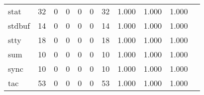 \begin{longtable}{lp{1.20cm}p{1.20cm}p{1.20cm}p{1.20cm}p{1.20cm}p{1.20cm}p{1.20cm}p{1.20cm}p{1.20cm}p{1.20cm}}
stat      &                                    32 &                                                  0 &                                                  0 &                                                  0 &                                                  0 &                                                 32 &                                         1.000 &                                              1.000 &                                              1.000 \\
stdbuf    &                                    14 &                                                  0 &                                                  0 &                                                  0 &                                                  0 &                                                 14 &                                         1.000 &                                              1.000 &                                              1.000 \\
stty      &                                    18 &                                                  0 &                                                  0 &                                                  0 &                                                  0 &                                                 18 &                                         1.000 &                                              1.000 &                                              1.000 \\
sum       &                                    10 &                                                  0 &                                                  0 &                                                  0 &                                                  0 &                                                 10 &                                         1.000 &                                              1.000 &                                              1.000 \\
sync      &                                    10 &                                                  0 &                                                  0 &                                                  0 &                                                  0 &                                                 10 &                                         1.000 &                                              1.000 &                                              1.000 \\
tac       &                                    53 &                                                  0 &                                                  0 &                                                  0 &                                                  0 &                                                 53 &                                         1.000 &                                              1.000 &                                              1.000 \\

\end{longtable}
